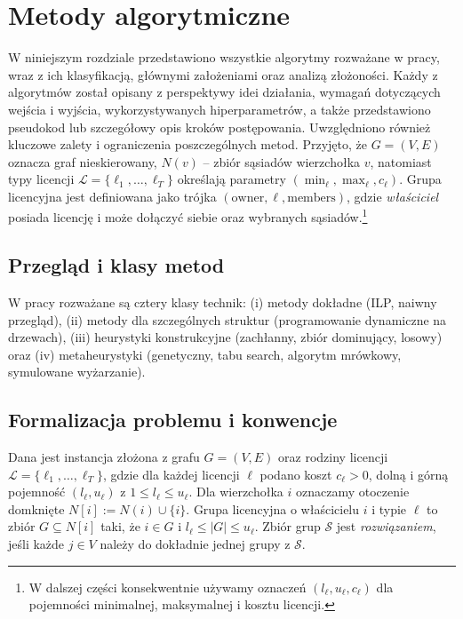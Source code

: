 \chapter{Metody algorytmiczne}\label{chap:algorithms}

W niniejszym rozdziale przedstawiono wszystkie algorytmy rozważane w pracy, wraz z ich klasyfikacją, głównymi założeniami oraz analizą złożoności. Każdy z algorytmów został opisany z perspektywy idei działania, wymagań dotyczących wejścia i wyjścia, wykorzystywanych hiperparametrów, a także przedstawiono pseudokod lub szczegółowy opis kroków postępowania. Uwzględniono również kluczowe zalety i ograniczenia poszczególnych metod. Przyjęto, że $G=(V,E)$ oznacza graf nieskierowany, $N(v)$ – zbiór sąsiadów wierzchołka $v$, natomiast typy licencji $\mathcal{L}=\{\ell_1,\dots,\ell_T\}$ określają parametry $(\min_\ell,\max_\ell,c_\ell)$. Grupa licencyjna jest definiowana jako trójka $(\text{owner},\ell,\text{members})$, gdzie \emph{właściciel} posiada licencję i może dołączyć siebie oraz wybranych sąsiadów.\footnote{W dalszej części konsekwentnie używamy oznaczeń $(l_\ell, u_\ell, c_\ell)$ dla pojemności minimalnej, maksymalnej i kosztu licencji.}

\section{Przegląd i klasy metod}
W pracy rozważane są cztery klasy technik: (i) metody dokładne (ILP, naiwny przegląd), (ii) metody dla szczególnych struktur (programowanie dynamiczne na drzewach), (iii) heurystyki konstrukcyjne (zachłanny, zbiór dominujący, losowy) oraz (iv) metaheurystyki (genetyczny, tabu search, algorytm mrówkowy, symulowane wyżarzanie).

\section{Formalizacja problemu i konwencje}\label{sec:model-formal}
\begin{definition}
Dana jest instancja złożona z grafu $G=(V,E)$ oraz rodziny licencji $\mathcal{L}=\{\ell_1,\dots,\ell_T\}$, gdzie dla każdej licencji $\ell$ podano koszt $c_\ell>0$, dolną i górną pojemność $(l_\ell, u_\ell)$ z $1\le l_\ell\le u_\ell$. Dla wierzchołka $i$ oznaczamy otoczenie domknięte $N[i]:=N(i)\cup\{i\}$. Grupa licencyjna o właścicielu $i$ i typie $\ell$ to zbiór $G\subseteq N[i]$ taki, że $i\in G$ i $l_\ell\le |G|\le u_\ell$. Zbiór grup $\mathcal{S}$ jest \emph{rozwiązaniem}, jeśli każde $j\in V$ należy do dokładnie jednej grupy z $\mathcal{S}$.
\end{definition}

